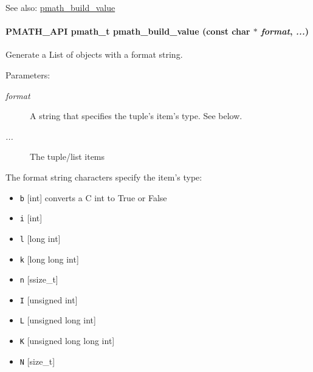 \begin{Desc}
\item[See also:]\hyperlink{group__helpers_g13a748aa283c5f5408cce037d3ad224d}{pmath\_\-build\_\-value} \end{Desc}
\hypertarget{group__helpers_g13a748aa283c5f5408cce037d3ad224d}{
\paragraph[{pmath\_\-build\_\-value}]{\setlength{\rightskip}{0pt plus 5cm}PMATH\_\-API {\bf pmath\_\-t} pmath\_\-build\_\-value (const char $\ast$ {\em format}, \/   {\em ...})}\hfill}
\label{group__helpers_g13a748aa283c5f5408cce037d3ad224d}


Generate a List of objects with a format string. 

\begin{Desc}
\item[Parameters:]
\begin{description}
\item[{\em format}]A string that specifies the tuple's item's type. See below. \item[{\em ...}]The tuple/list items\end{description}
\end{Desc}
The format string characters specify the item's type:\begin{itemize}
\item {\tt b} \mbox{[}int\mbox{]} converts a C int to True or False\end{itemize}


\begin{itemize}
\item {\tt i} \mbox{[}int\mbox{]}\item {\tt l} \mbox{[}long int\mbox{]}\item {\tt k} \mbox{[}long long int\mbox{]}\item {\tt n} \mbox{[}ssize\_\-t\mbox{]}\end{itemize}


\begin{itemize}
\item {\tt I} \mbox{[}unsigned int\mbox{]}\item {\tt L} \mbox{[}unsigned long int\mbox{]}\item {\tt K} \mbox{[}unsigned long long int\mbox{]}\item {\tt N} \mbox{[}size\_\-t\mbox{]}\end{itemize}


